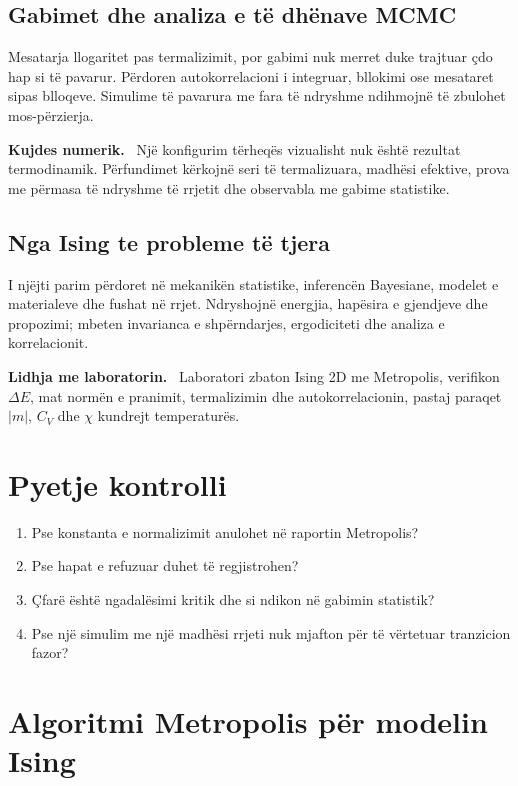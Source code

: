 \documentclass[11pt,oneside,openany]{book}
\newenvironment{kujdes}{\par\medskip\noindent\textbf{Kujdes numerik.}\ }{\par\medskip}
\newenvironment{lidhje}{\par\medskip\noindent\textbf{Lidhja me laboratorin.}\ }{\par\medskip}
\begin{document}
\subsection{Gabimet dhe analiza e të dhënave MCMC}
Mesatarja llogaritet pas termalizimit, por gabimi nuk merret duke trajtuar çdo hap si të pavarur. Përdoren autokorrelacioni i integruar, bllokimi ose mesataret sipas blloqeve. Simulime të pavarura me fara të ndryshme ndihmojnë të zbulohet mos-përzierja.

\begin{kujdes}
Një konfigurim tërheqës vizualisht nuk është rezultat termodinamik. Përfundimet kërkojnë seri të termalizuara, madhësi efektive, prova me përmasa të ndryshme të rrjetit dhe observabla me gabime statistike.
\end{kujdes}

\subsection{Nga Ising te probleme të tjera}
I njëjti parim përdoret në mekanikën statistike, inferencën Bayesiane, modelet e materialeve dhe fushat në rrjet. Ndryshojnë energjia, hapësira e gjendjeve dhe propozimi; mbeten invarianca e shpërndarjes, ergodiciteti dhe analiza e korrelacionit.

\begin{lidhje}
Laboratori zbaton Ising 2D me Metropolis, verifikon $\Delta E$, mat normën e pranimit, termalizimin dhe autokorrelacionin, pastaj paraqet $|m|$, $C_V$ dhe $\chi$ kundrejt temperaturës.
\end{lidhje}

\section*{Pyetje kontrolli}
\begin{enumerate}
\item Pse konstanta e normalizimit anulohet në raportin Metropolis?
\item Pse hapat e refuzuar duhet të regjistrohen?
\item Çfarë është ngadalësimi kritik dhe si ndikon në gabimin statistik?
\item Pse një simulim me një madhësi rrjeti nuk mjafton për të vërtetuar tranzicion fazor?
\end{enumerate}

\section{Algoritmi Metropolis për modelin Ising}
\end{document}
